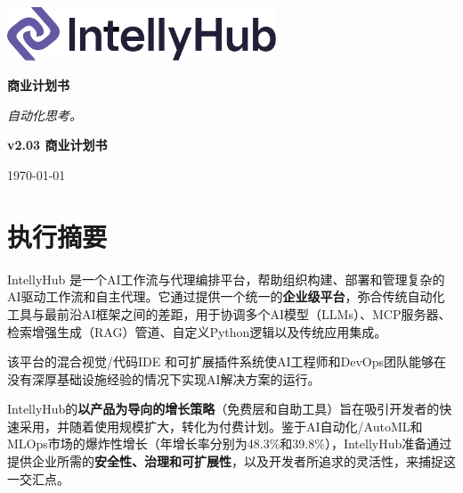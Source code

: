 \documentclass[11点, A4纸, 单面]{article}
\begin{document}
\thispagestyle{empty} 
\begin{titlepage}
    \centering
    \vspace{1cm}
    
    \includegraphics[width=0.6\textwidth]{IntellyHub_Logo_Colored.png}
    
    \vspace{2.5cm}
    
    {\Huge\bfseries\color{PrimaryColor}商业计划书}
    
    \vspace{1.5cm}
    
    {\Large\itshape\lightfont 自动化思考。}
    
    \vfill %
     
    {\large\bfseries\color{PrimaryColor}v2.03 \color{SecondaryColor}商业计划书}
    
    \vspace{0.5cm}
    
    {\large \today}
    
\end{titlepage}

\tableofcontents
\newpage


\section{执行摘要}
IntellyHub 是一个AI工作流与代理编排平台，帮助组织构建、部署和管理复杂的AI驱动工作流和自主代理。它通过提供一个统一的\textbf{企业级平台}，弥合传统自动化工具与最前沿AI框架之间的差距，用于协调多个AI模型（LLMs）、MCP服务器、检索增强生成（RAG）管道、自定义Python逻辑以及传统应用集成。

该平台的混合视觉/代码IDE 和可扩展插件系统使AI工程师和DevOps团队能够在没有深厚基础设施经验的情况下实现AI解决方案的运行。

IntellyHub的\textbf{以产品为导向的增长策略}（免费层和自助工具）旨在吸引开发者的快速采用，并随着使用规模扩大，转化为付费计划。鉴于AI自动化/AutoML和MLOps市场的爆炸性增长（年增长率分别为48.3\%\cite{AIMarket}和39.8\%\cite{MLOpsMarket}），IntellyHub准备通过提供企业所需的\textbf{安全性、治理和可扩展性}，以及开发者所追求的灵活性，来捕捉这一交汇点。
\end{document}
